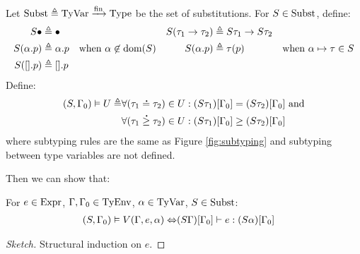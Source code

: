 Let $\text{Subst}\triangleq{\text{TyVar}}\xrightarrow{\text{fin}}{\text{Type}}$ be the set of substitutions.
For $S\in\text{Subst}$, define:
\begin{align*}
  S\bullet    & \triangleq\bullet  &                                  &  & S(\tau_1\rightarrow\tau_2) & \triangleq S\tau_1\rightarrow S\tau_2                                      \\
  S(\alpha.p) & \triangleq\alpha.p & \text{when }\alpha\not\in\text{dom}(S) &  & S(\alpha.p)                & \triangleq \tau(p)                    & \text{when }\alpha\mapsto\tau\in S \\
  S([].p)     & \triangleq [].p
\end{align*}
Define:
\begin{align*}
  (S,\Gamma_0)\vDash U\triangleq & \forall(\tau_1\overset{\,_{\mbox{\Large .}}}{=}\tau_2)\in U:(S\tau_1)[\Gamma_0]= (S\tau_2)[\Gamma_0]\text{ and} \\
                                  & \forall(\tau_1\overset{\,_{\mbox{\Large .}}}{\ge}\tau_2)\in U:(S\tau_1)[\Gamma_0]\ge(S\tau_2)[\Gamma_0]
\end{align*}
where subtyping rules are the same as Figure \ref{fig:subtyping} and subtyping between type variables are not defined.

Then we can show that:
\begin{theorem}[Correctness of $V$]\normalfont
  For $e\in\text{Expr}$, $\Gamma,\Gamma_0\in\text{TyEnv}$, $\alpha\in\text{TyVar}$, $S\in\text{Subst}$:
  \begin{align*}
    (S,\Gamma_0)\vDash V(\Gamma,e,\alpha) \Leftrightarrow & (S\Gamma)[\Gamma_0]\vdash e:(S\alpha)[\Gamma_0]
  \end{align*}
\end{theorem}
\begin{proof}[Sketch]
  Structural induction on $e$.
\end{proof}

